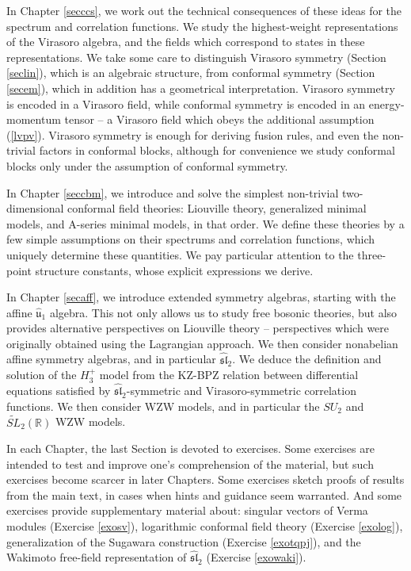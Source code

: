 \documentclass[12pt,a4paper,notitlepage]{report}
\numberwithin{equation}{section}
\theoremstyle{break}
\begin{document}
In Chapter \ref{secccs}, we work out the technical consequences of these ideas for the spectrum and correlation functions. We study the highest-weight representations of the Virasoro algebra, and the fields which correspond to states in these representations. We take some care to distinguish Virasoro symmetry (Section \ref{seclin}), which is an algebraic structure, from conformal symmetry (Section \ref{secem}), which in addition has a geometrical interpretation. Virasoro symmetry is encoded in a Virasoro field, while conformal symmetry is encoded in an energy-momentum tensor -- a Virasoro field which obeys the additional assumption (\ref{lvpv}). Virasoro symmetry is enough for deriving fusion rules, and even the non-trivial factors in conformal blocks, although for convenience we study conformal blocks only under the assumption of conformal symmetry. 

In Chapter \ref{seccbm}, we introduce and solve the simplest non-trivial two-dimensional conformal field theories: Liouville theory, generalized minimal models, and A-series minimal models, in that order. We define these theories by a few simple assumptions on their spectrums and correlation functions, which uniquely determine these quantities. We pay particular attention to the three-point structure constants, whose explicit expressions we derive. 

In Chapter \ref{secaff}, we introduce extended symmetry algebras, starting with the affine $\hat{\mathfrak{u}}_1$ algebra. This not only allows us to study free bosonic theories, but also provides alternative perspectives on Liouville theory -- perspectives which were originally obtained using the Lagrangian approach. We then consider nonabelian affine symmetry algebras, and in particular $\widehat{\mathfrak{sl}}_2$. We deduce the definition and solution of the $H_3^+$ model from the KZ-BPZ relation between differential equations satisfied by $\widehat{\mathfrak{sl}}_2$-symmetric and Virasoro-symmetric correlation functions. We then consider WZW models, and in particular the $SU_2$ and $\widetilde{SL}_2(\mathbb{R})$ WZW models. 

In each Chapter, the last Section is devoted to exercises. Some exercises are intended to test and improve one's comprehension of the material, but such exercises become scarcer in later Chapters. Some exercises sketch proofs of results from the main text, in cases when hints and guidance seem warranted. And some exercises provide supplementary material about: singular vectors of Verma modules (Exercise \ref{exosv}), logarithmic conformal field theory (Exercise \ref{exolog}), generalization of the Sugawara construction (Exercise \ref{exotqpj}), and the Wakimoto free-field representation of $\widehat{\mathfrak{sl}}_2$ (Exercise \ref{exowaki}).
\end{document}
